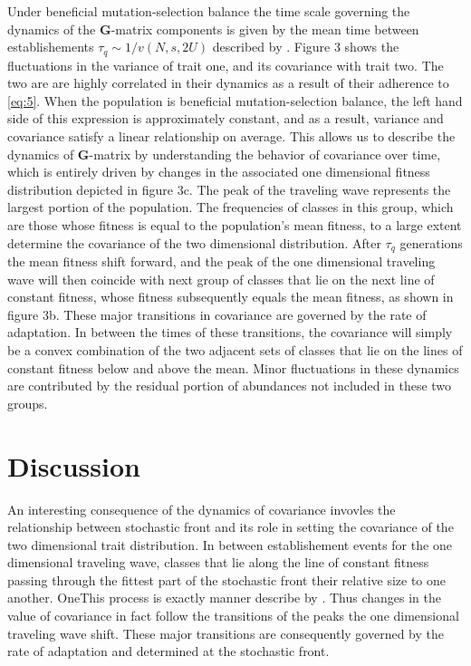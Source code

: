 \documentclass[11pt,twocolumn]{article}
\newcommand{\G}{\textbf{G}}
\begin{document}
Under beneficial mutation-selection balance the time scale governing the dynamics of the \G-matrix components is given by the mean time between establishements $\tau_q \sim 1/v(N,s,2U)$ described by \cite{desai2007beneficial}. Figure 3 shows the fluctuations in the variance of trait one, and its covariance with trait two. The two are are highly correlated in their dynamics as a result of their adherence to \eqref{eq:5}. When the population is beneficial mutation-selection balance, the left hand side of this expression is approximately constant, and as a result, variance and covariance satisfy a linear relationship on average. This allows us to describe the dynamics of \G-matrix by understanding the behavior of covariance over time, which is entirely driven by changes in the associated one dimensional fitness distribution depicted in figure 3c. The peak of the traveling wave represents the largest portion of the population. The frequencies of classes in this group, which are those whose fitness is equal to the population's mean fitness, to a large extent determine the covariance of the two dimensional distribution. After $\tau_q$ generations the mean fitness shift forward, and the peak of the one dimensional traveling wave will then coincide with next group of classes that lie on the next line of constant fitness, whose fitness subsequently equals the mean fitness, as shown in figure 3b. These major transitions in covariance are governed by the rate of adaptation. In between the times of these transitions, the covariance will simply be a convex combination of the two adjacent sets of classes that lie on the lines of constant fitness below and above the mean. Minor fluctuations in these dynamics are contributed by the residual portion of abundances not included in these two groups.\par

\section*{Discussion}
\label{sec:discussion}

An interesting consequence of the dynamics of covariance invovles the relationship between stochastic front and its role in setting the covariance of the two dimensional trait distribution. In between establishement events for the one dimensional traveling wave, classes that lie along the line of constant fitness passing through the fittest part of the stochastic front their relative size to one another. OneThis process is exactly  manner describe by \cite{Desai2013}. Thus changes in the value of covariance in fact follow the transitions of the peaks the one dimensional traveling wave shift. These major transitions are consequently governed by the rate of adaptation and determined at the stochastic front.   
\end{document}
